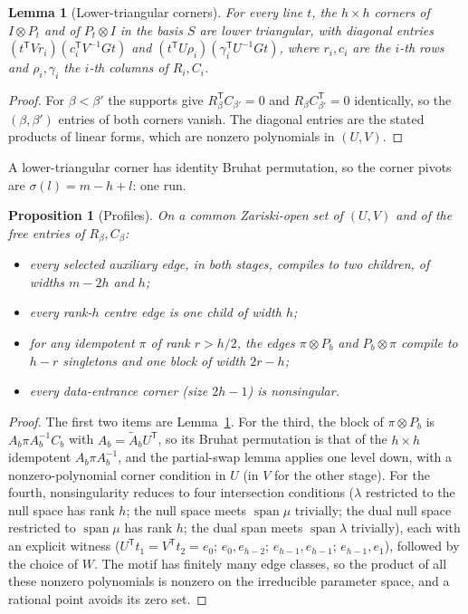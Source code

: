 \documentclass[11pt]{article}
\newtheorem{lemma}{Lemma}
\newtheorem{proposition}{Proposition}
\theoremstyle{remark}\newtheorem*{remark}{Remark}
\begin{document}
\begin{lemma}[Lower-triangular corners]\label{lem:flag}
For every line $t$, the $h\times h$ corners of $I\otimes P_t$ and of $P_t\otimes I$ in the basis $S$ are lower
triangular, with diagonal entries $(t^{\mathsf T}Vr_i)(c_i^{\mathsf T}V^{-1}Gt)$ and $(t^{\mathsf T}U\rho_i)(\gamma_i^{\mathsf T}U^{-1}Gt)$,
where $r_i,c_i$ are the $i$-th rows and $\rho_i,\gamma_i$ the $i$-th columns of $R_i,C_i$.
\end{lemma}
\begin{proof}
For $\beta<\beta'$ the supports give $R_\beta^{\mathsf T}C_{\beta'}=0$ and $R_\beta C_{\beta'}^{\mathsf T}=0$ identically, so the
$(\beta,\beta')$ entries of both corners vanish. The diagonal entries are the stated products of linear forms, which
are nonzero polynomials in $(U,V)$.
\end{proof}

A lower-triangular corner has identity Bruhat permutation, so the corner pivots are $\sigma(l)=m-h+l$: one run.

\begin{proposition}[Profiles]\label{prop:profiles}
On a common Zariski-open set of $(U,V)$ and of the free entries of $R_\beta,C_\beta$:
\begin{itemize}
\item every selected auxiliary edge, in both stages, compiles to two children, of widths $m-2h$ and $h$;
\item every rank-$h$ centre edge is one child of width $h$;
\item for any idempotent $\pi$ of rank $r>h/2$, the edges $\pi\otimes P_b$ and $P_b\otimes\pi$ compile to $h-r$
singletons and one block of width $2r-h$;
\item every data-entrance corner (size $2h-1$) is nonsingular.
\end{itemize}
\end{proposition}
\begin{proof}
The first two items are Lemma~\ref{lem:flag}. For the third, the block of $\pi\otimes P_b$ is
$A_b\pi A_b^{-1}C_b$ with $A_b=\tilde A_bU^{\mathsf T}$, so its Bruhat permutation is that of the $h\times h$ idempotent
$A_b\pi A_b^{-1}$, and the partial-swap lemma applies one level down, with a nonzero-polynomial corner condition in $U$
(in $V$ for the other stage). For the fourth, nonsingularity reduces to four intersection conditions
($\lambda$ restricted to the null space has rank $h$; the null space meets $\operatorname{span}\mu$ trivially; the dual null
space restricted to $\operatorname{span}\mu$ has rank $h$; the dual span meets $\operatorname{span}\lambda$ trivially), each with an
explicit witness ($U^{\mathsf T}t_1=V^{\mathsf T}t_2=e_0$; $e_0,e_{h-2}$; $e_{h-1},e_{h-1}$; $e_{h-1},e_1$), followed by the choice of $W$.
The motif has finitely many edge classes, so the product of all these nonzero polynomials is nonzero on the
irreducible parameter space, and a rational point avoids its zero set.
\end{proof}
\end{document}
